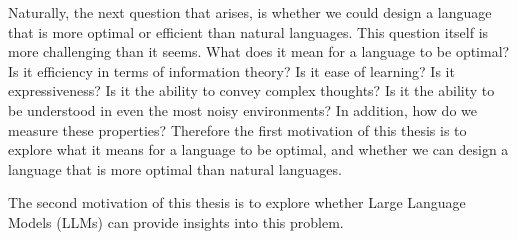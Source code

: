 Naturally, the next question that arises, is whether we could design a language that is more optimal or efficient than natural languages.
This question itself is more challenging than it seems. What does it mean for a language to be optimal? Is it efficiency in terms of information theory?
Is it ease of learning? Is it expressiveness? Is it the ability to convey complex thoughts? Is it the ability to be understood in even the most noisy environments?
In addition, how do we measure these properties? Therefore the first motivation of this thesis is to explore what it means for a language to be optimal, 
and whether we can design a language that is more optimal than natural languages.

The second motivation of this thesis is to explore whether Large Language Models (LLMs) can provide insights into this problem.



